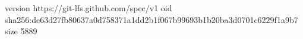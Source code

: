 version https://git-lfs.github.com/spec/v1
oid sha256:de63d27fb80637a0d758371a1dd2b1f067b99693b1b20ba3d0701c6229f1a9b7
size 5889

